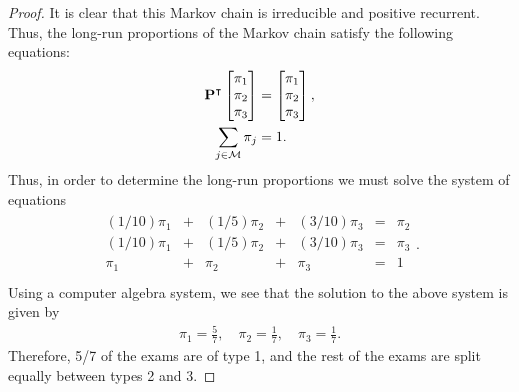 \begin{proof}
  It is clear that this Markov chain is irreducible and positive recurrent. Thus,
  the long-run proportions of the Markov chain satisfy the following equations:
  \begin{align*}
     \bold{P}^\intercal \begin{bmatrix} \pi_1 \\ \pi_2 \\ \pi_3 \\ \end{bmatrix} &= \begin{bmatrix} \pi_1 \\ \pi_2 \\ \pi_3 \\ \end{bmatrix},\\
     \sum_{j\in \mathcal{M}} \pi_j &= 1.
  \end{align*}
  Thus, in order to determine the long-run proportions we must solve the system of
  equations
  \begin{align*}
    \begin{array}{rrrrrrr}
      (1/10)\pi_1 &+& (1/5)\pi_2 &+& (3/10)\pi_3 &=& \pi_2 \\
      (1/10)\pi_1 &+& (1/5)\pi_2 &+& (3/10)\pi_3 &=& \pi_3 \\
      \pi_1       &+& \pi_2      &+& \pi_3       &=& 1 \\
    \end{array}.
  \end{align*}
  Using a computer algebra system, we see that the solution to the above system is given
  by
  \begin{align*}
    \pi_1 = \frac{5}{7}, \quad \pi_2 = \frac{1}{7}, \quad \pi_3 = \frac{1}{7}.
  \end{align*}
Therefore, 5/7 of the exams are of type 1, and the rest of the exams are split equally between types 2 and 3.
\end{proof}
\newpage
